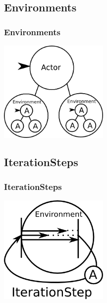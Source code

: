 \subsection{Environments}
\begin{frame}
	\frametitle{Environments}
	\includegraphics[width=200px]{Images/environment.png}
\end{frame}
\subsection{IterationSteps}
\begin{frame}
  \frametitle{IterationSteps}
  \includegraphics[width=200px]{Images/iteration.png}
\end{frame}
